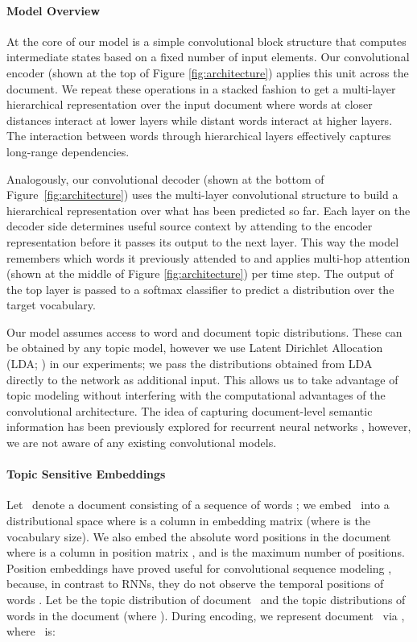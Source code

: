 \documentclass[11pt,a4paper]{article}
\begin{document}
\paragraph{Model Overview}

At the core of our model is a simple convolutional block structure
that computes intermediate states based on a fixed number of input
elements. Our convolutional encoder (shown at the top of Figure
\ref{fig:architecture}) applies this unit across the document. We
repeat these operations in a stacked fashion to get a multi-layer
hierarchical representation over the input document where words at
closer distances interact at lower layers while distant words interact
at higher layers. The interaction between words through hierarchical
layers effectively captures long-range dependencies. 


Analogously, our convolutional decoder (shown at the bottom of
Figure~\ref{fig:architecture}) uses the multi-layer convolutional
structure to build a hierarchical representation over what has been
predicted so far. Each layer on the decoder side determines useful
source context by attending to the encoder representation before it
passes its output to the next layer. This way the model remembers
which words it previously attended to and applies multi-hop attention
(shown at the middle of Figure \ref{fig:architecture}) per time
step. The output of the top layer is passed to a softmax classifier to
predict a distribution over the target vocabulary.


Our model assumes access to word and document topic
distributions. These can be obtained by any topic model, however we
use Latent Dirichlet Allocation (LDA; \citealt{Blei:2003:LDA}) in our
experiments; we pass the distributions obtained from LDA directly to
the network as additional input. This allows us to take advantage of
topic modeling without interfering with the computational advantages
of the convolutional architecture. The idea of capturing
document-level semantic information has been previously explored for
recurrent neural networks
\cite{mikolovZ12,Ghosh2016ContextualL,dieng-iclr17}, however, we are
not aware of any existing convolutional models.


\paragraph{Topic Sensitive Embeddings}

Let~ denote a document consisting of a sequence of words ; we embed~ into a distributional space  where  is a column in
embedding matrix  (where  is the
vocabulary size). We also embed the absolute word positions in the
document \mbox{} where  is a column in position matrix , and  is the maximum number of
positions. Position embeddings have proved useful for convolutional
sequence modeling \cite{convseq2seq}, because, in contrast to RNNs,
they do not observe the temporal positions of words
\cite{D16-1248}. Let  be the topic
distribution of document~ and 
the topic distributions of words in the document (where ). During encoding, we represent document~ via
, where~ is:
\end{document}
